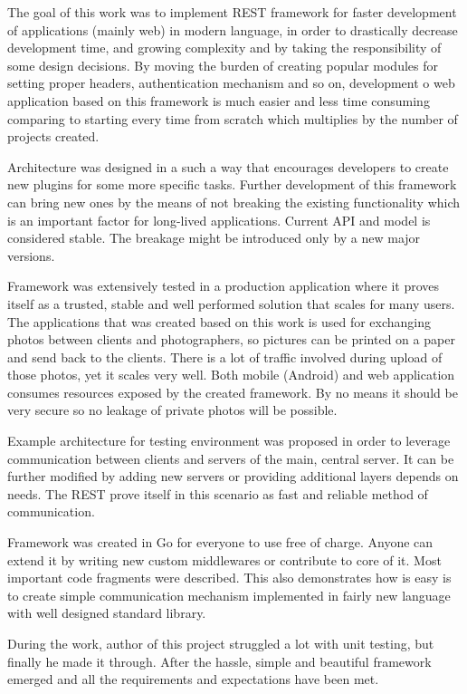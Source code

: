 The goal of this work was to implement REST framework for faster development of applications (mainly web) in modern language, in order to drastically decrease development time, and growing complexity and by taking the responsibility of some design decisions. By moving the burden of creating popular modules for setting proper headers, authentication mechanism and so on, development o web application based on this framework is much easier and less time consuming comparing to starting every time from scratch which multiplies by the number of projects created.

Architecture was designed in a such a way that encourages developers to create new plugins for some more specific tasks. Further development of this framework can bring new ones by the means of not breaking the existing functionality which is an important factor for long-lived applications. Current API and model is considered stable. The breakage might be introduced only by a new major versions.

Framework was extensively tested in a production application where it proves itself as a trusted, stable and well performed solution that scales for many users. The applications that was created based on this work is used for exchanging photos between clients and photographers, so pictures can be printed on a paper and send back to the clients. There is a lot of traffic involved during upload of those photos, yet it scales very well. Both mobile (Android) and web application consumes resources exposed by the created framework. By no means it should be very secure so no leakage of private photos will be possible.

Example architecture for testing environment was proposed in order to leverage communication between clients and servers of the main, central server. It can be further modified by adding new servers or providing additional layers depends on needs. The REST prove itself in this scenario as fast and reliable method of communication.

Framework was created in Go for everyone to use free of charge. Anyone can extend it by writing new custom middlewares or contribute to core of it. Most important code fragments were described. This also demonstrates how is easy is to create simple communication mechanism implemented in fairly new language with well designed standard library.

During the work, author of this project struggled a lot with unit testing, but finally he made it through. After the hassle, simple and beautiful framework emerged and all the requirements and expectations have been met.
